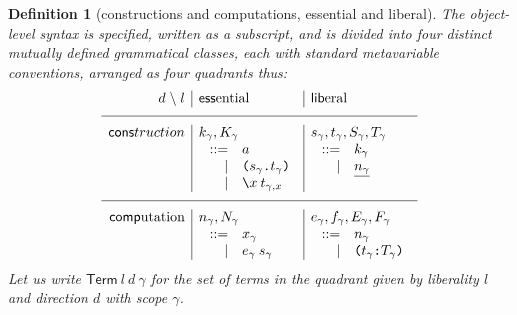 \documentclass{jfp1}
\newtheorem{definition}[theorem]{Definition}
\newcommand{\Pa}[1]{\texttt{(}#1\texttt{)}}
\newcommand{\dt}{\texttt{.}}
\newcommand{\cn}[2]{\Pa{#1 \dt #2}}
\newcommand{\hb}{\texttt{:}}
\newcommand{\ra}[2]{\Pa{#1 \hb #2}}
\newcommand{\Ne}{\underline}
\newcommand{\Se}{\mathsf}
\begin{document}
\newcommand{\Tm}[3]{\Se{Term}\:#1\:#2\:#3}
\begin{definition}[constructions and computations, essential and liberal\label{def:syntax}]
The object-level syntax is specified,
written as a subscript, and
is divided into four distinct mutually defined grammatical classes,
each with standard metavariable conventions,
arranged as four quadrants thus:
\[\begin{array}{r|l|l}
 d \;\backslash\; l& \ess\mbox{ential} & \lib\mbox{eral} \\
\hline
    \cons{truction} & k_\gamma, K_\gamma & s_\gamma, t_\gamma, S_\gamma, T_\gamma \\
    & \;\begin{array}[t]{rl}
          ::= & a \\
          | & \cn{s_\gamma}{t_\gamma} \\
          | & \la xt_{\gamma,x}
        \end{array}
    & \;\begin{array}[t]{rl}
          ::= & k_\gamma \\
          | & \Ne{n_\gamma}
        \end{array}
    \\
    \hline
    \comp\mbox{utation} & n_\gamma, N_\gamma & e_\gamma, f_\gamma, E_\gamma, F_\gamma \\
    & \;\begin{array}[t]{rl}
          ::= & x_\gamma \\
          | & e_\gamma\:s_\gamma 
        \end{array}
    & \;\begin{array}[t]{rl}
          ::= & n_\gamma \\
          | & \ra{t_\gamma}{T_\gamma}
        \end{array}
    \\
  \end{array}\]
Let us write $\Tm ld\gamma$ for the set of terms in the quadrant given
by \emph{liberality} $l$
and \emph{direction} $d$ with scope $\gamma$.
\end{definition}
\end{document}
